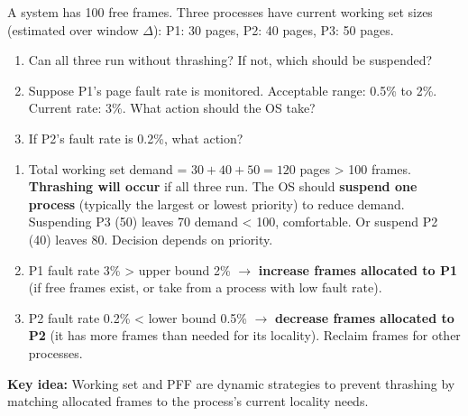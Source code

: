 \documentclass[11pt]{article}
\begin{document}
\begin{exoresolu}
A system has 100 free frames. Three processes have current working set sizes (estimated over window $\Delta$):
P1: 30 pages, P2: 40 pages, P3: 50 pages.
\begin{enumerate}
\item Can all three run without thrashing? If not, which should be suspended?
\item Suppose P1's page fault rate is monitored. Acceptable range: 0.5\% to 2\%. Current rate: 3\%. What action should the OS take?
\item If P2's fault rate is 0.2\%, what action?
\end{enumerate}
\tcblower
\begin{enumerate}
\item Total working set demand = $30+40+50 = 120$ pages > 100 frames. \textbf{Thrashing will occur} if all three run. The OS should \textbf{suspend one process} (typically the largest or lowest priority) to reduce demand. Suspending P3 (50) leaves 70 demand < 100, comfortable. Or suspend P2 (40) leaves 80. Decision depends on priority.
\item P1 fault rate 3\% > upper bound 2\% $\rightarrow$ \textbf{increase frames allocated to P1} (if free frames exist, or take from a process with low fault rate).
\item P2 fault rate 0.2\% < lower bound 0.5\% $\rightarrow$ \textbf{decrease frames allocated to P2} (it has more frames than needed for its locality). Reclaim frames for other processes.
\end{enumerate}
\textbf{Key idea:} Working set and PFF are dynamic strategies to prevent thrashing by matching allocated frames to the process's current locality needs.
\end{exoresolu}
\end{document}
